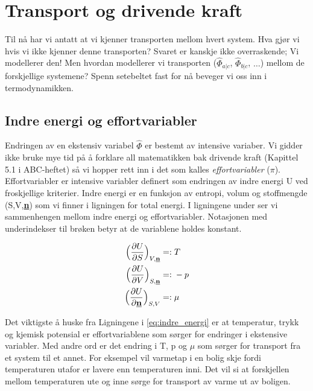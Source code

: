 \clearpage
\section{Transport og drivende kraft}\label{sec:transport_effort}
Til nå har vi antatt at vi kjenner transporten mellom hvert system. Hva gjør vi hvis vi ikke kjenner denne transporten? Svaret er kanskje ikke overraskende; Vi modellerer den! Men hvordan modellerer vi transporten ($\hat{\Phi}_{a|c}$, $\hat{\Phi}_{b|c}$, $\dots$) mellom de forskjellige systemene? Spenn setebeltet fast for nå beveger vi oss inn i termodynamikken.

\subsection{Indre energi og effortvariabler}\label{sec:indre_effort} Endringen av en ekstensiv variabel $\hat{\Phi}$ er bestemt av intensive variaber. Vi gidder ikke bruke mye tid på å forklare all matematikken bak drivende kraft (Kapittel 5.1 i ABC-heftet) så vi hopper rett inn i det som kalles \textit{effortvariabler} ($\pi$). Effortvariabler er intensive variabler definert som endringen av indre energi U ved froskjellige kriterier. Indre energi er en funksjon av entropi, volum og stoffmengde (S,V,\underline{\textbf{n}}) som vi finner i ligningen for total energi. I ligningene under ser vi sammenhengen mellom indre energi og effortvariabler.  Notasjonen med underindekser til brøken betyr at de variablene holdes konstant.

\begin{equation}
\label{eq:indre_energi}
\begin{split}
\Big(\frac{\partial U}{\partial S}\Big)_{V,\underline{\textbf{n}}} =:&\hspace{0.1cm} T \\
\Big(\frac{\partial U}{\partial V}\Big)_{S,\underline{\textbf{n}}} =:&\hspace{0.1cm} -p \\
\Big(\frac{\partial U}{\partial \underline{\textbf{n}}}\Big)_{S,V} =:&\hspace{0.1cm} \mu
\end{split}
\end{equation}

Det viktigste å huske fra Ligningene i \ref{eq:indre_energi} er at temperatur, trykk og kjemisk potensial er effortvariablene som sørger for endringer i ekstensive variabler. Med andre ord er det endring i T, p og $\mu$ som sørger for transport fra et system til et annet. For eksempel vil varmetap i en bolig skje fordi temperaturen utafor er lavere enn temperaturen inni. Det vil si at forskjellen mellom temperaturen ute og inne sørge for transport av varme ut av boligen. 

